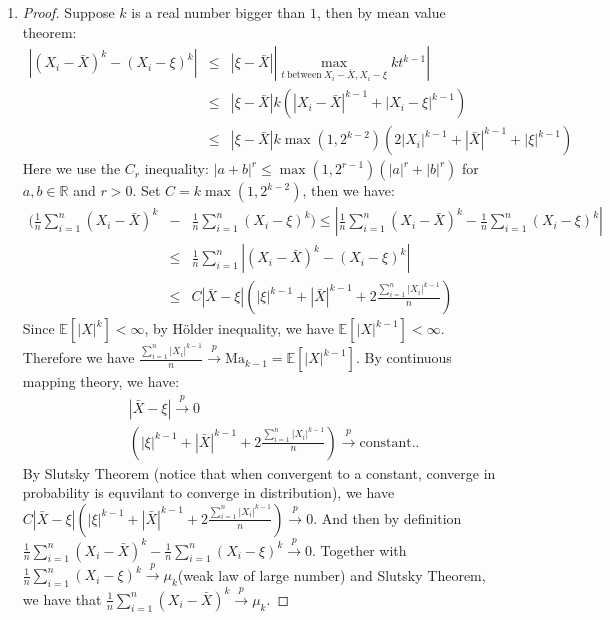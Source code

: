 \documentclass[12pt]{article}
\newcommand{\ep}[1]{\mathbb{E}\left[ #1 \right]}
\newcommand{\cp}{\overset{p}{\to}}
\begin{document}
\begin{enumerate}
    \item
    \begin{proof}
    Suppose $k$ is a real number bigger than $1$, then by mean value theorem: 
    \begin{eqnarray}
        |(X_i - \bar{X})^k - (X_i - \xi)^k| &\le& |\xi - \bar{X}| | \max_{t \ \text{between} \ X_i-\bar{X}, X_i-\xi} k t^{k-1} | \\        
                                            &\le& |\xi - \bar{X}| k (|X_i - \bar{X}|^{k-1} + |X_i - \xi|^{k-1}) \\
                                            &\le& |\xi - \bar{X}| k \max(1,2^{k-2}) (2 |X_i|^{k-1} + |\bar{X}|^{k-1} + |\xi|^{k-1})
    \end{eqnarray}
    Here we use the $C_r$ inequality: $|a+b|^r \le \max(1,2^{r-1})(|a|^r + |b|^r)$ for $a,b \in \mathbb{R}$ and $r > 0$.
    Set $C = k \max(1, 2^{k-2})$, then we have:
    \begin{eqnarray}
        (\frac{1}{n}\sum_{i=1}^n (X_i - \bar{X})^k &-& \frac{1}{n}\sum_{i=1}^n (X_i - \xi)^k) \le |\frac{1}{n}\sum_{i=1}^n (X_i - \bar{X})^k - \frac{1}{n}\sum_{i=1}^n (X_i - \xi)^k| \\
                                                                                            &\le& \frac{1}{n} \sum_{i=1}^n |(X_i - \bar{X})^k - (X_i - \xi)^k| \\
                                                                                            &\le& C |\bar{X} - \xi| (|\xi|^{k-1}+|\bar{X}|^{k-1}+2\frac{\sum_{i=1}^n|X_i|^{k-1}}{n})    
    \end{eqnarray}
    Since $\ep{|X|^k} < \infty$, by H\"{o}lder inequality, we have $\ep{|X|^{k-1}} < \infty$. Therefore we have $\frac{\sum_{i=1}^n|X_i|^{k-1}}{n} \cp \text{Ma}_{k-1} = \ep{|X|^{k-1}}$. By continuous mapping theory, we have:
    \begin{eqnarray}
        &&|\bar{X} - \xi| \cp 0 \\
        &&(|\xi|^{k-1}+|\bar{X}|^{k-1}+2\frac{\sum_{i=1}^n|X_i|^{k-1}}{n}) \cp \text{constant..}
    \end{eqnarray}
    By Slutsky Theorem (notice that when convergent to a constant, converge in probability is equvilant to converge in distribution), we have $C |\bar{X} - \xi| (|\xi|^{k-1}+|\bar{X}|^{k-1}+2\frac{\sum_{i=1}^n|X_i|^{k-1}}{n}) \cp 0$.
    And then by definition $\frac{1}{n}\sum_{i=1}^n (X_i - \bar{X})^k - \frac{1}{n}\sum_{i=1}^n (X_i - \xi)^k \cp 0$. Together with $\frac{1}{n}\sum_{i=1}^n (X_i - \xi)^k \cp \mu_k$(weak law of large number) and Slutsky Theorem, we have that $\frac{1}{n}\sum_{i=1}^n (X_i - \bar{X})^k \cp \mu_k$.    
    \end{proof}


\end{enumerate}
\end{document}
